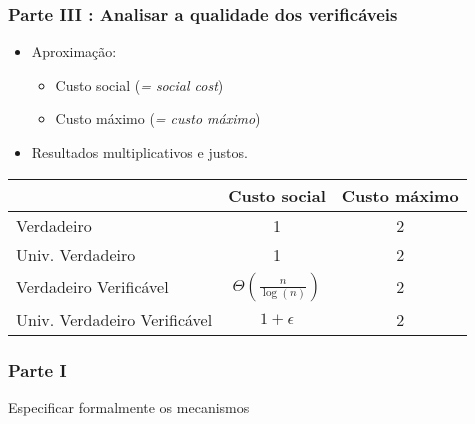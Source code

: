 \documentclass[usenames,dvipsnames]{beamer}
\begin{document}
\begin{frame}
\frametitle{Parte III : Analisar a qualidade dos verificáveis}
\begin{itemize}
\item Aproximação:
\begin{itemize}
    \item Custo social (\textit{= social cost})
    \item Custo máximo (\textit{= custo máximo})
\end{itemize}
\item Resultados multiplicativos e justos.
\end{itemize}

\begin{table}
\begin{tabular}{l c c}
\toprule
 & \textbf{Custo social} & \textbf{Custo máximo}\\
\midrule
Verdadeiro & 1 & 2 \\
Univ. Verdadeiro & 1 & 2 \\
\midrule
Verdadeiro Verificável & $\Theta(\frac{n}{\log(n)})$ & 2 \\
Univ. Verdadeiro Verificável & $1 + \epsilon$ & 2 \\
\bottomrule
\end{tabular}
\end{table}
\end{frame}

\begin{frame}
\frametitle{Parte I}
Especificar formalmente os mecanismos
\end{frame}
\end{document}
